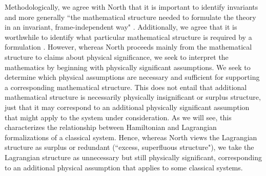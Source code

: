 \documentclass[letterpaper]{article}
\begin{document}
Methodologically, we agree with North that it is important to identify invariants and more generally ``the mathematical structure needed to formulate the theory in an invariant, frame-independent way" \parencites*[65]{North2009}. Additionally, we agree that it is worthwhile to identify what particular mathematical structure is required by a formulation \parencites[78]{North2009}. However, whereas North proceeds mainly from the mathematical structure to claims about physical significance, we seek to interpret the mathematics by beginning with physically significant assumptions. We seek to determine which physical assumptions are necessary and sufficient for supporting a corresponding mathematical structure. This does not entail that additional mathematical structure is necessarily physically insignificant or surplus structure, just that it may correspond to an additional physically significant assumption that might apply to the system under consideration. As we will see, this characterizes the relationship between Hamiltonian and Lagrangian formalizations of a classical system. Hence, whereas North views the Lagrangian structure as surplus or redundant (``excess, superfluous structure"), we take the Lagrangian structure as unnecessary but still physically significant, corresponding to an additional physical assumption that applies to some classical systems.
\end{document}
